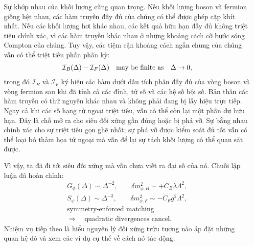 Sự khớp nhau của khối lượng cũng quan trọng. Nếu khối lượng boson và fermion giống hệt nhau, các hàm truyền đầy đủ của chúng có thể được ghép cặp khít nhất. Nếu các khối lượng hơi khác nhau, các kết quả hữu hạn đầy đủ không triệt tiêu chính xác, vì các hàm truyền khác nhau ở những khoảng cách cỡ bước sóng Compton của chúng. Tuy vậy, các tiệm cận khoảng cách ngắn chung của chúng vẫn có thể triệt tiêu phần phân kỳ:
\begin{equation}
\mathcal I_B(\Delta)-\mathcal I_F(\Delta)
\quad\hbox{may be finite as}\quad \Delta\to0,
\end{equation}
trong đó \(\mathcal I_B\) và \(\mathcal I_F\) ký hiệu các hàm dưới dấu tích phân đầy đủ của vòng boson và vòng fermion sau khi đã tính cả các đỉnh, tử số và các hệ số bội số. Bản thân các hàm truyền có thứ nguyên khác nhau và không phải đang bị lấy hiệu trực tiếp. Ngay cả khi các số hạng tử ngoại triệt tiêu, vẫn có thể còn lại một phần dư hữu hạn. Đây là chỗ mở ra cho siêu đối xứng gần đúng hoặc bị phá vỡ. Sự bằng nhau chính xác cho sự triệt tiêu gọn ghẽ nhất; sự phá vỡ được kiểm soát đủ tốt vẫn có thể loại bỏ thảm họa tử ngoại mà vẫn để lại sự tách khối lượng có thể quan sát được.

Vì vậy, ta đã đi tới siêu đối xứng mà vẫn chưa viết ra đại số của nó. Chuỗi lập luận đã hoàn chỉnh:
\begin{equation}
\begin{gathered}
G_\phi(\Delta)\sim \Delta^{-2},
\qquad
\delta m_{\phi,B}^2\sim+C_B\lambda\Lambda^2,\\[0.4em]
S_\psi(\Delta)\sim \Delta^{-3},
\qquad
\delta m_{\phi,F}^2\sim-C_Fg^2\Lambda^2,\\[0.4em]
\text{symmetry-enforced matching}\\
\Longrightarrow\quad
\text{quadratic divergences cancel}.
\end{gathered}
\end{equation}
Nhiệm vụ tiếp theo là hiểu nguyên lý đối xứng trừu tượng nào áp đặt những quan hệ đó và xem các ví dụ cụ thể về cách nó tác động.
